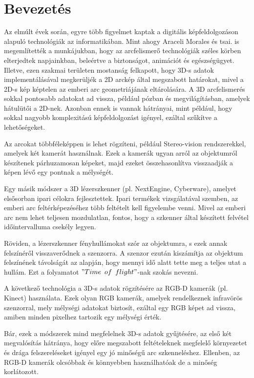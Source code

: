\documentclass[12pt,a4]{article}
\begin{document}
    \section{Bevezetés}
        Az elmúlt évek során, egyre több figyelmet kaptak a digitális képfeldolgozáson alapuló technológiák az informatikában. 
        Mint ahogy \cite{survey}Araceli Morales és tsai. is megemlítették a munkájukban, hogy az arcfelismerő technológiák széles körben elterjedtek napjainkban, beleértve a biztonságot, animációt és egészségügyet. 
        Illetve, ezen szakmai területen mostanság felkapott, hogy 3D-s adatok implementálásával megkerüljék a 2D arckép által megszabott határokat, mivel a 2D-s kép képtelen az emberi arc geometriájának eltárolására.
        A 3D arcfelismerés sokkal pontosabb adatokat ad vissza, például pózban és megvilágításban, amelyek hátulütői a 2D-nek. Azonban ennek is vannak hátrányai, mint például, hogy sokkal nagyobb komplexitású képfeldolgozást igényel, ezáltal szűkítve a lehetőségeket.

        Az arcokat többféleképpen is lehet rögzíteni, például Stereo-vision rendszerekkel, amelyek két kamerát használnak. Ezek a kamerák ugyan arról az objektumról készítenek párhuzamosan képeket, majd ezeket összehasonlítva visszaadják a képen lévő egy pontnak a mélységét.

        Egy másik módszer a 3D lézerszkenner (pl. NextEngine, Cyberware), amelyet elsősorban ipari célokra fejlesztettek. Ipari termékek vizsgálatával szemben, az emberi arc feltérképezéséhez több feltételt kell figyelembe venni. Mivel az emberi arc nem lehet teljesen mozdulatlan, fontos, hogy a szkenner által készített felvétel időintervalluma csekély legyen.

        Röviden, a lézerszkenner fényhullámokat szór az objektumra, s ezek annak felszínéről visszaverődnek a szenzorra. A szenzor ezután kiszámítja az objektum felszínének távolságát az alapján, hogy mennyi idő alatt tette meg a teljes utat a hullám. Ezt a folyamatot $"Time\enspace of\enspace flight"$-nak szokás nevezni.

        A következő technológia a 3D-s adatok rögzítésére az RGB-D kamerák (pl. Kinect) használata. Ezek olyan RGB kamerák, amelyek rendelkeznek infravörös szenzorral, mely mélységi adatokat biztosít, ezáltal egy RGB képet ad vissza, amiben minden pixelhez tartozik egy mélységi érték.

        Bár, ezek a módszerek mind megfelelnek 3D-s adatok gyűjtésére, az első két megvalósítás hátránya, hogy előre megszabott feltételeknek megfelelő környezetet és drága felszereléseket igényel egy jó minőségű arc szkenneléshez. Ellenben, az RGB-D kamerák olcsóbbak és könnyebben használhatóak de a minőség korlátozott.
\end{document}
